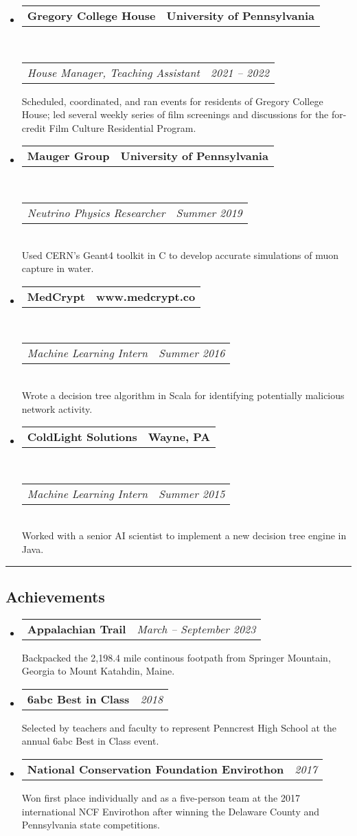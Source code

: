 \documentclass[11pt,letterpaper]{article}
\makeatletter
\newcommand{\headerrow}[2]
{\begin{tabular*}{\linewidth}{l@{\extracolsep{\fill}}r}
	#1 &
	#2 \\
\end{tabular*}}
\newcommand{\CPP}
{C\nolinebreak[4]\hspace{-.05em}\raisebox{.22ex}{\footnotesize\bf ++}}
\makeatother
\begin{document}
\begin{itemize}
	\parskip=0.1em

	\item
	\headerrow
		{\bfseries Gregory College House}
		{\bfseries University of Pennsylvania}
	\\
	\headerrow
		{\em House Manager, Teaching Assistant}
		{\em 2021 -- 2022}
	Scheduled, coordinated, and ran events for residents of Gregory College House;
	led several weekly series of film screenings and discussions for the for-credit Film Culture Residential Program.

	\item
	\headerrow
		{\bfseries Mauger Group}
		{\bfseries University of Pennsylvania}
	\\
	\headerrow
		{\em Neutrino Physics Researcher}
		{\em Summer 2019}
	\\
	Used CERN's Geant4 toolkit in \CPP{} to develop accurate simulations of muon capture in water.

	\item
	\headerrow
		{\bfseries MedCrypt}
		{\bfseries www.medcrypt.co}
	\\
	\headerrow
		{\em Machine Learning Intern}
		{\em Summer 2016}
	\\
	Wrote a decision tree algorithm in Scala for identifying potentially malicious network activity.

	\item
	\headerrow
		{\bfseries ColdLight Solutions}
		{\bfseries Wayne, PA}
	\\
	\headerrow
		{\em Machine Learning Intern}
		{\em Summer 2015}
	\\
	Worked with a senior AI scientist to implement a new decision tree engine in Java.

\end{itemize}

\hrule
\vspace{-0.4em}
\subsection*{Achievements}

\begin{itemize}
	\parskip=0.1em

	\item
	\headerrow
		{\bfseries Appalachian Trail}
		{\em March -- September 2023}
	Backpacked the 2,198.4 mile continous footpath from Springer Mountain, Georgia to Mount Katahdin, Maine.

	\item
	\headerrow
		{\bfseries 6abc Best in Class}
		{\em 2018}
	Selected by teachers and faculty to represent Penncrest High School at the annual 6abc Best in Class event.

	\item
	\headerrow
		{\bfseries National Conservation Foundation Envirothon}
		{\em 2017}
	Won first place individually and as a five-person team at the 2017 international NCF Envirothon after winning the Delaware County and Pennsylvania state competitions.

\end{itemize}
\end{document}
